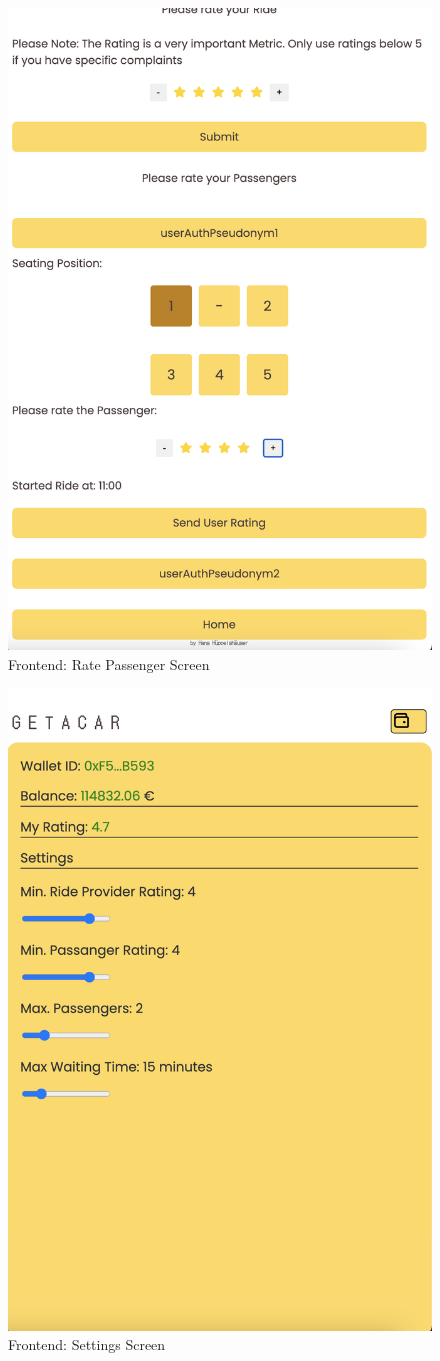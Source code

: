\begin{figure}[h]
\begin{minipage}{0.45\linewidth}
        \includegraphics[width=\linewidth]{data/ffss/12.png}
        \caption{Frontend: Rate Passenger Screen}
        \label{fig:RatePassengerScreen}
    \end{minipage}
    
\end{figure}


\begin{figure}[h]
    \centering
    \includegraphics[width=0.4\linewidth]{data/ffss/13.png}
    \caption{Frontend: Settings Screen}
    \label{fig:SettingsScreen}
\end{figure}
